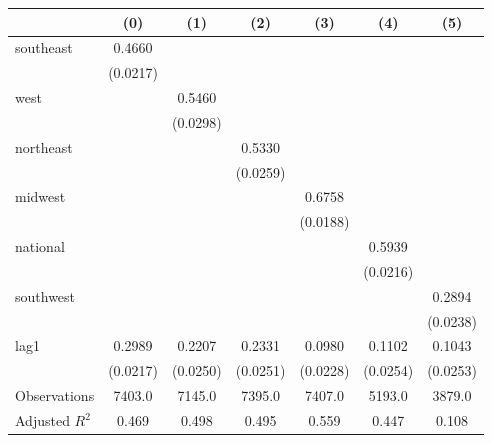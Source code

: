 \begin{tabular}{lcccccc}
\toprule
 & (0) & (1) & (2) & (3) & (4) & (5) \\
\midrule
southeast & 0.4660 &  &  &  &  &  \\
\vspace{0.2cm}
 & (0.0217) &  &  &  &  &  \\
west &  & 0.5460 &  &  &  &  \\
\vspace{0.2cm}
 &  & (0.0298) &  &  &  &  \\
northeast &  &  & 0.5330 &  &  &  \\
\vspace{0.2cm}
 &  &  & (0.0259) &  &  &  \\
midwest &  &  &  & 0.6758 &  &  \\
\vspace{0.2cm}
 &  &  &  & (0.0188) &  &  \\
national &  &  &  &  & 0.5939 &  \\
\vspace{0.2cm}
 &  &  &  &  & (0.0216) &  \\
southwest &  &  &  &  &  & 0.2894 \\
\vspace{0.2cm}
 &  &  &  &  &  & (0.0238) \\
lag1 & 0.2989 & 0.2207 & 0.2331 & 0.0980 & 0.1102 & 0.1043 \\
\vspace{0.2cm}
 & (0.0217) & (0.0250) & (0.0251) & (0.0228) & (0.0254) & (0.0253) \\
\midrule
Observations & 7403.0 & 7145.0 & 7395.0 & 7407.0 & 5193.0 & 3879.0 \\
Adjusted $R^2$ & 0.469 & 0.498 & 0.495 & 0.559 & 0.447 & 0.108 \\
\bottomrule
\end{tabular}